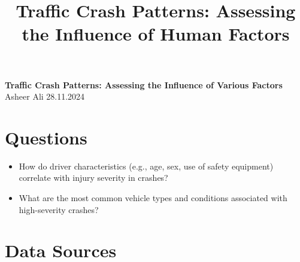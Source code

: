 \documentclass[a4paper,12pt]{article}
\title{Traffic Crash Patterns: Assessing the Influence of Human Factors}
\author{} %
\date{} %
\begin{document}
\begin{center}
    \textbf{\Large Traffic Crash Patterns: Assessing the Influence of Various Factors} \\[1em]
    Asheer Ali \hspace{2cm} 28.11.2024
\end{center}

\section{Questions}
\begin{itemize}
    \item How do driver characteristics (e.g., age, sex, use of safety equipment) correlate with injury severity in crashes?
    \item What are the most common vehicle types and conditions associated with high-severity crashes?
\end{itemize}

\section{Data Sources}
\end{document}
